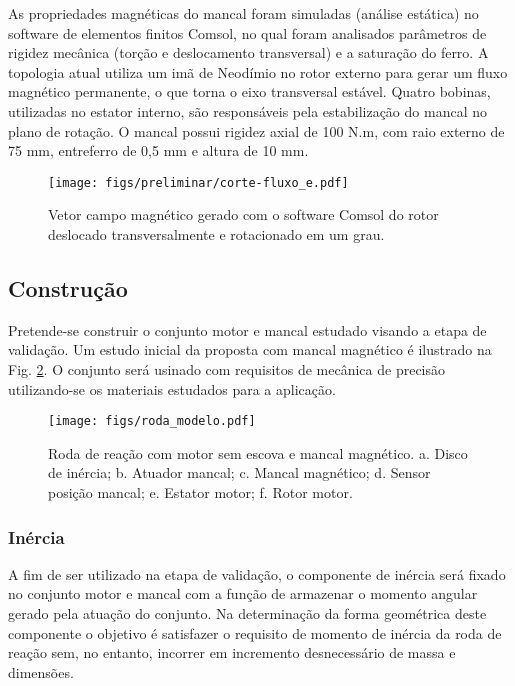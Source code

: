 	As propriedades magnéticas do mancal foram simuladas (análise estática) no software de elementos finitos Comsol, no qual foram analisados parâmetros de rigidez mecânica (torção e deslocamento transversal) e a saturação do ferro.  A topologia atual utiliza um imã de Neodímio no rotor externo para gerar um fluxo magnético permanente, o que torna o eixo transversal estável.  Quatro bobinas, utilizadas no estator interno, são responsáveis pela estabilização do mancal no plano de rotação. O mancal possui rigidez axial de 100 N.m,   com raio externo de 75 mm, entreferro de 0,5 mm e altura de 10 mm.
	
	\begin{figure}[!h]  
		\centering
			\texttt{[image: figs/preliminar/corte-fluxo\_e.pdf]}
		\caption{ Vetor campo magnético gerado com o software Comsol do rotor deslocado transversalmente e rotacionado em um grau. }
		\label{fig:corte:campo}
	\end{figure}
		
\subsection{Construção}

Pretende-se construir o conjunto motor e mancal estudado visando a etapa de validação. Um estudo inicial da proposta com mancal magnético é ilustrado na Fig. \ref{fig:roda}. O conjunto será usinado com requisitos de mecânica de precisão utilizando-se os materiais estudados para a aplicação.

\begin{figure}[!h]  
	\centering
		\texttt{[image: figs/roda\_modelo.pdf]}
	\caption{Roda de reação com motor sem escova e mancal magnético. a. Disco de inércia; b. Atuador mancal; c. Mancal magnético; d. Sensor posição mancal; e. Estator motor; f. Rotor motor.}
	\label{fig:roda}
\end{figure}

\subsubsection{Inércia}\label{sec:inercia}
	
A fim de ser utilizado na etapa de validação, o componente de inércia será fixado no conjunto motor e mancal com a função de armazenar o momento angular gerado pela atuação do conjunto. Na determinação da forma geométrica deste componente o objetivo é satisfazer o requisito de momento de inércia da roda de reação sem, no entanto, incorrer em incremento desnecessário de massa e dimensões.

